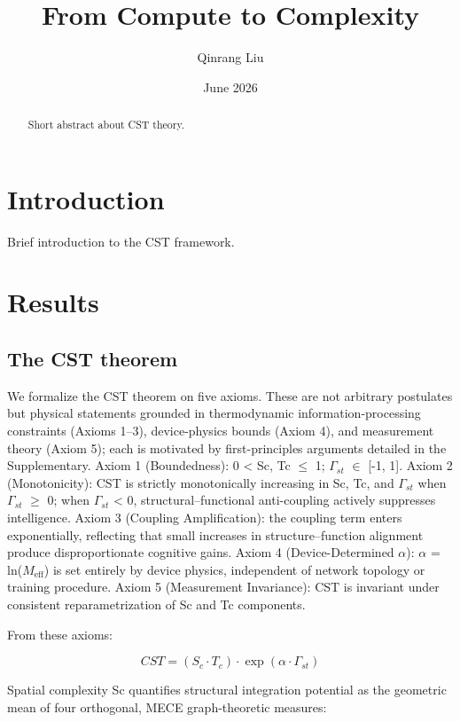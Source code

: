 \documentclass[a4paper,12pt]{article}
\title{From Compute to Complexity}
\author{Qinrang Liu}
\date{June 2026}
\begin{document}
\maketitle
\begin{abstract}
Short abstract about CST theory.
\end{abstract}
\section{Introduction}
Brief introduction to the CST framework.

\section{Results}



\subsection{The CST theorem}

We formalize the CST theorem on five axioms.
These are not arbitrary postulates but physical statements grounded in thermodynamic information-processing constraints (Axioms 1--3), device-physics bounds (Axiom 4), and measurement theory (Axiom 5); each is motivated by first-principles arguments detailed in the Supplementary.
Axiom 1 (Boundedness): 0 < Sc, Tc $\leq$ 1; $\Gamma_{st}$ $\in$ [-1, 1].
Axiom 2 (Monotonicity): CST is strictly monotonically increasing in Sc, Tc, and $\Gamma_{st}$ when $\Gamma_{st}$ $\geq$ 0; when $\Gamma_{st}$ < 0, structural--functional anti-coupling actively suppresses intelligence.
Axiom 3 (Coupling Amplification): the coupling term enters exponentially, reflecting that small increases in structure--function alignment produce disproportionate cognitive gains.
Axiom 4 (Device-Determined $\alpha$): $\alpha$ = ln($M_{\text{eff}}$) is set entirely by device physics, independent of network topology or training procedure.
Axiom 5 (Measurement Invariance): CST is invariant under consistent reparametrization of Sc and Tc components.


From these axioms:




\begin{equation}
CST = (S_c \cdot T_c) \cdot \exp(\alpha \cdot \Gamma_{st}) \tag{1}
\end{equation}

Spatial complexity Sc quantifies structural integration potential as the geometric mean of four orthogonal, MECE graph-theoretic measures:
\end{document}
